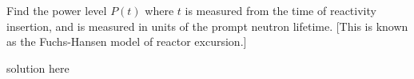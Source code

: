 \documentclass[11pt,addpoints,answers]{exam}
\begin{document}
\begin{questions}
        Find the power level $P(t)$  where $t$ is measured from the time of 
        reactivity insertion, and is measured in units of the prompt neutron lifetime.
        [This is known as the Fuchs-Hansen model of reactor excursion.]
                \begin{solution}
                        solution here
                \end{solution}

       
\end{questions}



%
%
\end{document}

